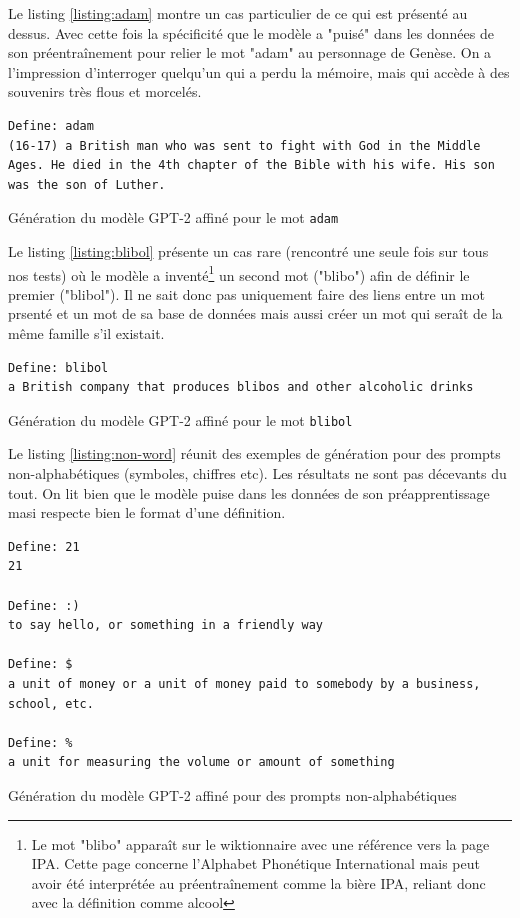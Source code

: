 \documentclass[french]{template}
\begin{document}
Le listing \ref{listing:adam} montre un cas particulier de ce qui est présenté au dessus. Avec cette fois la spécificité que le modèle a "puisé" dans les données de son préentraînement pour relier le mot "adam" au personnage de Genèse. On a l'impression d'interroger quelqu'un qui a perdu la mémoire, mais qui accède à des souvenirs très flous et morcelés.

\begin{listing}[H]
    \begin{verbatim}
Define: adam
(16-17) a British man who was sent to fight with God in the Middle Ages. He died in the 4th chapter of the Bible with his wife. His son was the son of Luther.
    \end{verbatim}
    \caption{Génération du modèle GPT-2 affiné pour le mot \texttt{adam}}
    \label{listing:adam}
\end{listing}

Le listing \ref{listing:blibol} présente un cas rare (rencontré une seule fois sur tous nos tests) où le modèle a inventé\footnote{Le mot "blibo" apparaît sur le wiktionnaire avec une référence vers la page IPA. Cette page concerne l'Alphabet Phonétique International mais peut avoir été interprétée au préentraînement comme la bière IPA, reliant donc avec la définition comme alcool} un second mot ("blibo") afin de définir le premier ("blibol"). Il ne sait donc pas uniquement faire des liens entre un mot prsenté et un mot de sa base de données mais aussi créer un mot qui seraît de la même famille s'il existait.

\begin{listing}[H]
    \begin{verbatim}
Define: blibol
a British company that produces blibos and other alcoholic drinks
    \end{verbatim}
    \caption{Génération du modèle GPT-2 affiné pour le mot \texttt{blibol}}
    \label{listing:blibol}
\end{listing}

Le listing \ref{listing:non-word} réunit des exemples de génération pour des prompts non-alphabétiques (symboles, chiffres etc). Les résultats ne sont pas décevants du tout. On lit bien que le modèle puise dans les données de son préapprentissage masi respecte bien le format d'une définition.

\begin{listing}[H]
    \begin{verbatim}
Define: 21
21

Define: :)
to say hello, or something in a friendly way

Define: $
a unit of money or a unit of money paid to somebody by a business, school, etc.

Define: %
a unit for measuring the volume or amount of something
    \end{verbatim}
    \caption{Génération du modèle GPT-2 affiné pour des prompts non-alphabétiques}
    \label{listing:non-word}
\end{listing}
\end{document}
